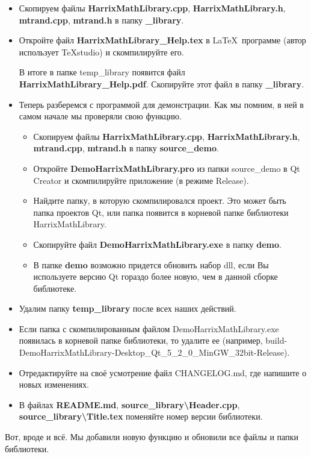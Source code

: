\begin{itemize}
\item Скопируем файлы \textbf{HarrixMathLibrary.cpp}, \textbf{HarrixMathLibrary.h}, \textbf{mtrand.cpp}, \textbf{mtrand.h} в папку \textbf{\_library}.

\item Откройте файл \textbf{HarrixMathLibrary\_Help.tex } в \LaTeX \ программе (автор использует TeXstudio) и скомпилируйте его.

В итоге в папке temp\_library появится файл \textbf{HarrixMathLibrary\_Help.pdf}. Скопируйте этот файл в папку \textbf{\_library}.

\item Теперь разберемся с программой для демонстрации. Как мы помним, в ней в самом начале мы проверяли свою функцию. 
\begin{itemize}
\item Скопируем файлы \textbf{HarrixMathLibrary.cpp}, \textbf{HarrixMathLibrary.h}, \textbf{mtrand.cpp}, \textbf{mtrand.h} в папку \textbf{source\_demo}.
\item  Откройте \textbf{DemoHarrixMathLibrary.pro} из папки source\_demo в Qt Creator и скомпилируйте приложение (в режиме Release).
\item Найдите папку, в которую скомпилировался проект. Это может быть папка проектов Qt, или папка появится в корневой папке библиотеки HarrixMathLibrary.
\item Скопируйте файл \textbf{DemoHarrixMathLibrary.exe} в папку \textbf{demo}.
\item В папке \textbf{demo} возможно придется обновить набор dll, если Вы используете версию Qt гораздо более новую, чем в данной сборке библиотеке.
\end{itemize}
\item Удалим папку \textbf{temp\_library} после всех наших действий.
\item  Если папка с скомпилированным файлом DemoHarrixMathLibrary.exe появилась в корневой папке библиотеки, то удалите ее (например, build-DemoHarrixMathLibrary-Desktop\_Qt\_5\_2\_0\_MinGW\_32bit-Release).
\item Отредактируйте на своё усмотрение файл CHANGELOG.md, где напишите о новых изменениях.
\item В файлах \textbf{README.md}, \textbf{source\_library\textbackslash Header.cpp}, \textbf{source\_library\textbackslash Title.tex} поменяйте номер версии библиотеки.
\end{itemize}

Вот, вроде и всё. Мы добавили новую функцию и обновили все файлы и папки библиотеки.